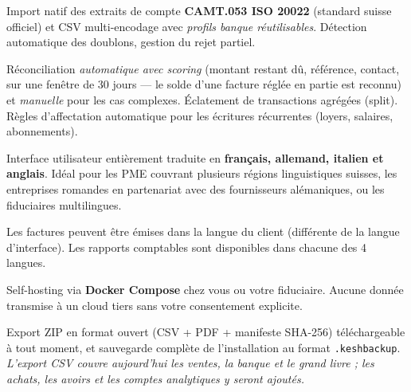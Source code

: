 \documentclass[a4paper,11pt,oneside]{article}
\begin{document}
\begin{tcolorbox}[%
    enhanced, breakable,
    colback=keshSurfaceAlt, colframe=keshInfo,
    boxrule=0pt, leftrule=4pt, arc=4pt,
    title=\sffamily\bfseries\color{keshInfo}{\faExchangeAlt\ Import bancaire automatisé}
]
\sffamily
Import natif des extraits de compte \textbf{CAMT.053 ISO 20022} (standard suisse officiel) et CSV multi-encodage avec \emph{profils banque réutilisables}. Détection automatique des doublons, gestion du rejet partiel.

Réconciliation \emph{automatique avec scoring} (montant restant dû, référence, contact, sur une fenêtre de 30 jours — le solde d'une facture réglée en partie est reconnu) et \emph{manuelle} pour les cas complexes. Éclatement de transactions agrégées (split). Règles d'affectation automatique pour les écritures récurrentes (loyers, salaires, abonnements).
\end{tcolorbox}

\vspace{0.3cm}

\begin{tcolorbox}[%
    enhanced, breakable,
    colback=keshSurfaceAlt, colframe=keshWarning,
    boxrule=0pt, leftrule=4pt, arc=4pt,
    title=\sffamily\bfseries\color{keshWarning}{\faLanguage\ Multilingue à 100\%}
]
\sffamily
Interface utilisateur entièrement traduite en \textbf{français, allemand, italien et anglais}. Idéal pour les PME couvrant plusieurs régions linguistiques suisses, les entreprises romandes en partenariat avec des fournisseurs alémaniques, ou les fiduciaires multilingues.

Les factures peuvent être émises dans la langue du client (différente de la langue d'interface). Les rapports comptables sont disponibles dans chacune des 4 langues.
\end{tcolorbox}

\vspace{0.3cm}

\begin{tcolorbox}[%
    enhanced, breakable,
    colback=keshSurfaceAlt, colframe=keshError,
    boxrule=0pt, leftrule=4pt, arc=4pt,
    title=\sffamily\bfseries\color{keshError}{\faLock\ Souveraineté des données}
]
\sffamily
Self-hosting via \textbf{Docker Compose} chez vous ou votre fiduciaire. Aucune donnée transmise à un cloud tiers sans votre consentement explicite.

Export ZIP en format ouvert (CSV + PDF + manifeste SHA-256) téléchargeable à tout moment, et sauvegarde complète de l'installation au format \texttt{.keshbackup}. \emph{L'export CSV couvre aujourd'hui les ventes, la banque et le grand livre ; les achats, les avoirs et les comptes analytiques y seront ajoutés.}
\end{tcolorbox}
\end{document}
